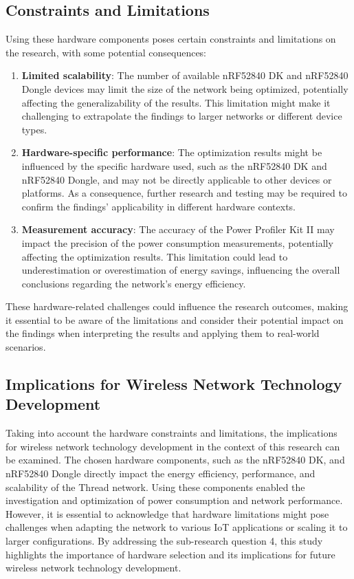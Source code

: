 \subsection{Constraints and Limitations}

Using these hardware components poses certain constraints and limitations on the research, with some potential consequences:

\begin{enumerate}
    \item \textbf{Limited scalability}: The number of available nRF52840 DK and nRF52840 Dongle devices may limit the size of the network being optimized, potentially affecting the generalizability of the results. This limitation might make it challenging to extrapolate the findings to larger networks or different device types.
    \item \textbf{Hardware-specific performance}: The optimization results might be influenced by the specific hardware used, such as the nRF52840 DK and nRF52840 Dongle, and may not be directly applicable to other devices or platforms. As a consequence, further research and testing may be required to confirm the findings' applicability in different hardware contexts.
    \item \textbf{Measurement accuracy}: The accuracy of the Power Profiler Kit II may impact the precision of the power consumption measurements, potentially affecting the optimization results. This limitation could lead to underestimation or overestimation of energy savings, influencing the overall conclusions regarding the network's energy efficiency.
\end{enumerate}

These hardware-related challenges could influence the research outcomes, making it essential to be aware of the limitations and consider their potential impact on the findings when interpreting the results and applying them to real-world scenarios.

\subsection{Implications for Wireless Network Technology Development}

Taking into account the hardware constraints and limitations, the implications for wireless network technology development in the context of this research can be examined. The chosen hardware components, such as the nRF52840 DK, and nRF52840 Dongle directly impact the energy efficiency, performance, and scalability of the Thread network. Using these components enabled the investigation and optimization of power consumption and network performance. However, it is essential to acknowledge that hardware limitations might pose challenges when adapting the network to various IoT applications or scaling it to larger configurations. By addressing the sub-research question 4, this study highlights the importance of hardware selection and its implications for future wireless network technology development.


